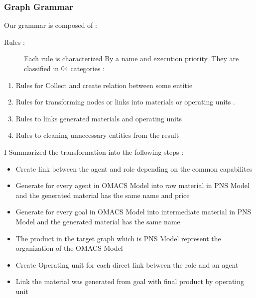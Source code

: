 \subsubsection{ Graph Grammar }
Our grammar is composed of :
\begin{description}

\item [{Rules :}]  

Each rule is characterized
By a name and execution priority. They are classified in 04 categories :

\end{description}

\begin{enumerate}
\item Rules for Collect and create relation between some entitie
\item Rules for transforming nodes or links into materials or operating units .
\item Rules to links generated materials and operating units
\item Rules to cleaning unnecessary entities from the result 

\end{enumerate}
I Summarized the transformation into the following steps  : 

\begin{itemize}

\item Create link between the agent and role depending on the common capabilites

\item Generate for every agent in OMACS Model into raw material in PNS Model
and the generated material has the same name and price 

\item Generate for every goal in OMACS Model into intermediate material in PNS Model and the generated material has the same name  


\item The product in the target graph which is PNS Model represent the organization of the OMACS Model

\item Create Operating unit for each direct link between the role and an agent 

\item Link the material was generated from goal with final product by operating unit

\end{itemize}

